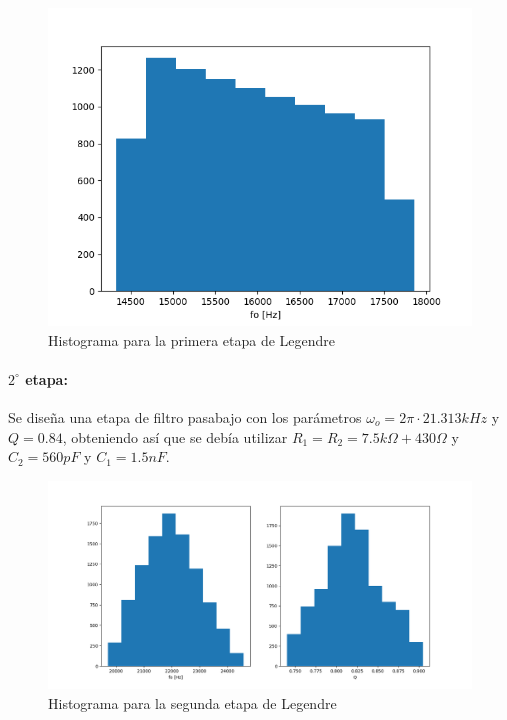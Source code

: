 \begin{figure}[H]
    \centering
    \includegraphics[scale=0.7]{../EJ1/Recursos/legendre_histogram_one.png}
    \caption{Histograma para la primera etapa de Legendre}
    \label{fig:legendre_histogram_one}
\end{figure}

\paragraph{$2^{\circ}$ etapa:} Se dise\~na una etapa de filtro pasabajo con los par\'ametros $\omega_o = 2 \pi \cdot 21.313kHz$ y $Q = 0.84$, obteniendo as\'i que se deb\'ia utilizar $R_1 = R_2 = 7.5k\Omega + 430 \Omega$ y $C_2 = 560pF$ y $C_1 = 1.5nF$.

\begin{figure}[H]
    \centering
    \includegraphics[scale=0.4]{../EJ1/Recursos/legendre_histogram_two.png}
    \caption{Histograma para la segunda etapa de Legendre}
    \label{fig:legendre_histogram_two}
\end{figure}

